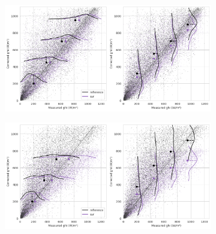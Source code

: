 \begin{figure}[htb!]
    \centering
    \begin{subfigure}{\columnwidth}
        \includegraphics[width=\columnwidth]{figures/first_study/scatter_plot_svr_site1_mae.png}
    \end{subfigure}
\medskip
    \begin{subfigure}{\columnwidth}
        \includegraphics[width=\columnwidth]{figures/first_study/scatter_plot_svr_site2_mae.png}
    \end{subfigure}
\medskip


\end{figure}
